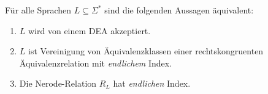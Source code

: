 \begin{Satz} %
        Für alle Sprachen $L\subseteq \Sigma^*$ sind die folgenden Aussagen äquivalent:
        \begin{enumerate}
                \item\label{itm:Nerode1} $L$ wird von einem \ac{DEA} akzeptiert.
                \item\label{itm:Nerode2} $L$ ist Vereinigung von Äquivalenzklassen einer rechtskongruenten Äquivalenzrelation mit \emph{endlichem} Index.
                \item\label{itm:Nerode3} Die Nerode-Relation $R_L$ hat \emph{endlichen} Index.
                \qedhere
        \end{enumerate}
\end{Satz}

